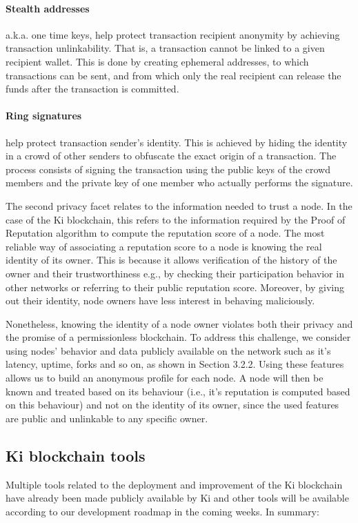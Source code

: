 \paragraph{Stealth addresses} a.k.a. one time keys, help protect transaction recipient anonymity by achieving transaction unlinkability. That is, a transaction cannot be linked to a given recipient wallet. This is done by creating ephemeral addresses, to which transactions can be sent, and from which only the real recipient can release the funds after the transaction is committed.

\paragraph{Ring signatures} help protect transaction sender's identity. This is achieved by hiding the identity in a crowd of other senders to obfuscate the exact origin of a transaction. The process consists of signing the transaction using the public keys of the crowd members and the private key of one member who actually performs the signature.

The second privacy facet relates to the information needed to trust a node. In the case of the Ki blockchain, this refers to the information required by the Proof of Reputation algorithm to compute the reputation score of a node. The most reliable way of associating a reputation score to a node is knowing the real identity of its owner. This is because it allows verification of the history of the owner and their trustworthiness e.g., by checking their participation behavior in other networks or referring to their public reputation score. Moreover, by giving out their identity, node owners have less interest in behaving maliciously.

Nonetheless, knowing the identity of a node owner violates both their privacy and the promise of a permissionless blockchain. To address this challenge, we consider using nodes' behavior and data publicly available on the network such as it's latency, uptime, forks and so on, as shown in Section 3.2.2. Using these features allows us to build an anonymous profile for each node. A node will then be known and treated based on its behaviour (i.e., it's reputation is computed based on this behaviour) and not on the identity of its owner, since the used features are public and unlinkable to any specific owner.

\subsection{Ki blockchain tools}
\label{sec:kiblockchaintools}
Multiple tools related to the deployment and improvement of the Ki blockchain have already been made publicly available by Ki and other tools will be available according to our development roadmap in the coming weeks. In summary:

